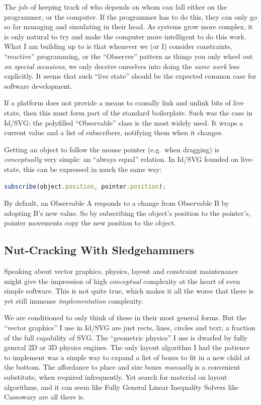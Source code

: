 The job of keeping track of who depends on whom can fall either on the
programmer, or the computer. If the programmer has to do this, they can
only go so far managing and simulating in their head. As systems grow
more complex, it is only natural to try and make the computer more
intelligent to do this work. What I am building up to is that whenever
we (or I) consider constraints, ``reactive'' programming, or the
``Observer'' pattern as things you only wheel out \emph{on special
occasions}, we only deceive ourselves into doing the \emph{same work}
less explicitly. It seems that such ``live state'' should be the
expected common case for software development.

If a platform does not provide a means to causally link and unlink bits
of live state, then this must form part of the standard boilerplate.
Such was the case in Id{}/SVG: the polyfilled ``Observable'' class is
the most widely used. It wraps a current value and a list of
subscribers, notifying them when it changes.

Getting an object to follow the mouse pointer (e.g.~when dragging) is
\emph{conceptually} very simple: an ``always equal'' relation. In
Id{}/SVG founded on live-state, this can be expressed in much the same
way:

\begin{lstlisting}[language=JavaScript, numbers=none]
subscribe(object.position, pointer.position);
\end{lstlisting}

By default, an Observable A responds to a change from Observable B by
adopting B's new value. So by subscribing the object's position to the
pointer's, pointer movements copy the new position to the object.

\hypertarget{nut-cracking-with-sledgehammers}{%
\subsection{Nut-Cracking With
Sledgehammers}\label{nut-cracking-with-sledgehammers}}

Speaking about vector graphics, physics, layout and constraint
maintenance might give the impression of high \emph{conceptual}
complexity at the heart of even simple software. This is not quite true,
which makes it all the worse that there is yet still immense
\emph{implementation} complexity.

We are conditioned to only think of these in their most general forms.
But the ``vector graphics'' I use in Id{}/SVG are just rects, lines,
circles and text; a fraction of the full capability of SVG. The
``geometric physics'' I use is dwarfed by fully general 2D or 3D physics
engines. The only layout algorithm I had the patience to implement was a
simple way to expand a list of boxes to fit in a new child at the
bottom. The affordance to place and size boxes \emph{manually} is a
convenient substitute, when required infrequently. Yet search for
material on layout algorithms, and it can seem like Fully General Linear
Inequality Solvers like Cassowary \cite{cassowary} are all there is.

